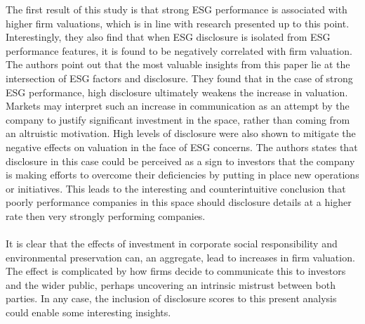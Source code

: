 {The first result of this study is that strong ESG performance is associated with higher firm valuations, which is in line with research presented up to this point. Interestingly, they also find that when ESG disclosure is isolated from ESG performance features, it is found to be negatively correlated with firm valuation. The authors point out that the most valuable insights from this paper lie at the intersection of ESG factors and disclosure. They found that in the case of strong ESG performance, high disclosure ultimately weakens the increase in valuation. Markets may interpret such an increase in communication as an attempt by the company to justify significant investment in the space, rather than coming from an altruistic motivation. High levels of disclosure were also shown to mitigate the negative effects on valuation in the face of ESG concerns. The authors states that disclosure in this case could be perceived as a sign to investors that the company is making efforts to overcome their deficiencies by putting in place new operations or initiatives. This leads to the interesting and counterintuitive conclusion that poorly performance companies in this space should disclosure details at a higher rate then very strongly performing companies. \\\\
It is clear that the effects of investment in corporate social responsibility and environmental preservation can, an aggregate, lead to increases in firm valuation. The effect is complicated by how firms decide to communicate this to investors and the wider public, perhaps uncovering an intrinsic mistrust between both parties. In any case, the inclusion of disclosure scores to this present analysis could enable some interesting insights. 

}
